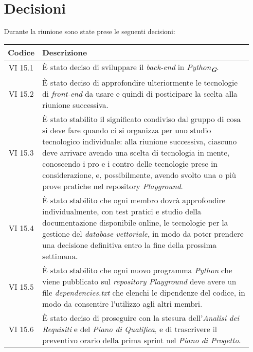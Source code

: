 
\section{Decisioni}

Durante la riunione sono state prese le seguenti decisioni:

\vspace{0.5cm}

\begin{table}[htbp]
    \centering
    \begin{tabular}{|c|p{}|}
        \hline
        \rowcolor[gray]{0.75}
        \textbf{Codice} & \textbf{Descrizione}\\
        \hline
        VI 15.1 & È stato deciso di sviluppare il \emph{back-end} in \emph{Python}\textsubscript{\textit{\textbf{G}}}. \\
        \hline
        VI 15.2 & È stato deciso di approfondire ulteriormente le tecnologie di \emph{front-end} da usare e quindi di posticipare la scelta alla riunione successiva. \\
        \hline
        VI 15.3 & È stato stabilito il significato condiviso dal gruppo di cosa si deve fare quando ci si organizza per uno studio tecnologico individuale:
        alla riunione successiva, ciascuno deve arrivare avendo una scelta di tecnologia in mente, conoscendo i pro e i contro delle tecnologie prese in considerazione,
        e, possibilmente, avendo svolto una o più prove pratiche nel repository \emph{Playground}. \\
        \hline
        VI 15.4 & È stato stabilito che ogni membro dovrà approfondire individualmente, con test pratici e studio della documentazione disponibile online,
        le tecnologie per la gestione del \emph{database vettoriale}, in modo da poter prendere una decisione definitiva entro la fine della prossima settimana. \\
        \hline
        VI 15.5 & È stato stabilito che ogni nuovo programma \emph{Python} che viene pubblicato sul \emph{repository Playground} deve avere un file \emph{dependencies.txt}
        che elenchi le dipendenze del codice, in modo da consentire l'utilizzo agli altri membri. \\
        \hline
        VI 15.6 & È stato deciso di proseguire con la stesura dell'\emph{Analisi dei Requisiti} e del \emph{Piano di Qualifica}, e di trascrivere il preventivo orario della prima sprint nel \emph{Piano di Progetto}. \\

\end{tabular}
\end{table}
